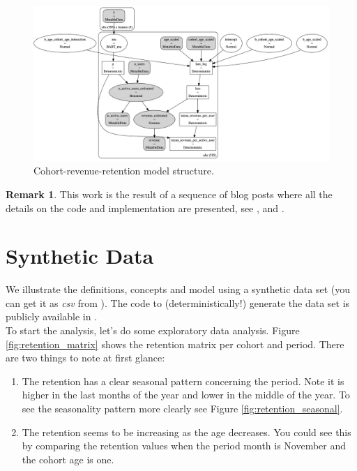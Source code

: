 \documentclass[11pt]{amsart}
\theoremstyle{definition}
\newtheorem{remark}{Remark}
\begin{document}
\begin{figure}
    \centering
    \includegraphics[width=\textwidth]{images/revenue_retention_33_0.png}
    \caption{Cohort-revenue-retention model structure.}
    \label{fig:revenue_retention_model}
\end{figure}


\begin{remark}
This work is the result of a sequence of blog posts where all the details on the code
and implementation are presented, see \cite{orduz_retention},
\cite{orduz_retention_bart} and \cite{orduz_revenue_retention}.  
\end{remark}


\section{Synthetic Data}

We illustrate the definitions, concepts and model using a synthetic data set (you can
get it as {\em csv} from \cite{orduz_revenue_retention_data}). The code to
(deterministically!) generate the data set is publicly available in 
\cite{orduz_revenue_retention_data_code}. \\

To start the analysis, let's do some exploratory data analysis. Figure
\ref{fig:retention_matrix} shows the retention matrix per cohort and period. There are 
two things to note at first glance:

\begin{enumerate}
    \item The retention has a clear seasonal pattern concerning the period. Note it is 
        higher in the last months of the year and lower in the middle of the year. To 
        see the seasonality pattern more clearly see Figure 
        \ref{fig:retention_seasonal}.
    \item The retention seems to be increasing as the age decreases. You could see this
    by comparing the retention values when the period month is November and the cohort
    age is one.
\end{enumerate}
\end{document}
